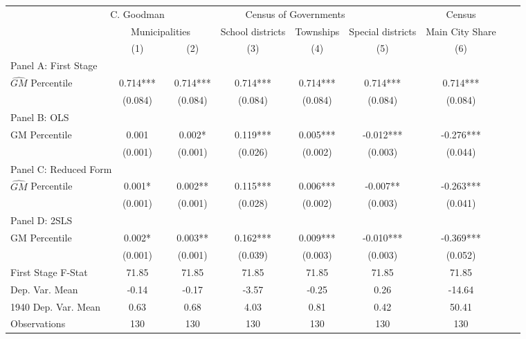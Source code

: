  \begin{tabular}{l*{8}{c}} \toprule
&\multicolumn{1}{c}{C. Goodman}&\multicolumn{4}{c}{Census of Governments}&\multicolumn{1}{c}{Census}\\\cmidrule(lr){2-2}\cmidrule(lr){3-6}\cmidrule(lr){7-7}
&\multicolumn{2}{c}{Municipalities}&\multicolumn{1}{c}{School districts}&\multicolumn{1}{c}{Townships}&\multicolumn{1}{c}{Special districts}&\multicolumn{1}{c}{Main City Share}\\\cmidrule(lr){2-3}\cmidrule(lr){4-6}\cmidrule(lr){7-7}
&\multicolumn{1}{c}{(1)}&\multicolumn{1}{c}{(2)}&\multicolumn{1}{c}{(3)}&\multicolumn{1}{c}{(4)}&\multicolumn{1}{c}{(5)}&\multicolumn{1}{c}{(6)}\\
\cmidrule(lr){1-7}
\multicolumn{6}{l}{Panel A: First Stage}\\
\cmidrule(lr){1-7}
$\widehat{GM}$ Percentile&    0.714***&    0.714***&    0.714***&    0.714***&    0.714***&    0.714***\\
                &  (0.084)   &  (0.084)   &  (0.084)   &  (0.084)   &  (0.084)   &  (0.084)   \\
\cmidrule(lr){1-7}
\multicolumn{6}{l}{Panel B: OLS}\\
\cmidrule(lr){1-7}
GM Percentile   &    0.001   &    0.002*  &    0.119***&    0.005***&   -0.012***&   -0.276***\\
                &  (0.001)   &  (0.001)   &  (0.026)   &  (0.002)   &  (0.003)   &  (0.044)   \\
\cmidrule(lr){1-7}
\multicolumn{6}{l}{Panel C: Reduced Form}\\
\cmidrule(lr){1-7}
$\widehat{GM}$ Percentile&    0.001*  &    0.002** &    0.115***&    0.006***&   -0.007** &   -0.263***\\
                &  (0.001)   &  (0.001)   &  (0.028)   &  (0.002)   &  (0.003)   &  (0.041)   \\
\cmidrule(lr){1-7}
\multicolumn{6}{l}{Panel D: 2SLS}\\
\cmidrule(lr){1-7}
GM Percentile   &    0.002*  &    0.003** &    0.162***&    0.009***&   -0.010***&   -0.369***\\
                &  (0.001)   &  (0.001)   &  (0.039)   &  (0.003)   &  (0.003)   &  (0.052)   \\
\midrule
First Stage F-Stat&    71.85   &    71.85   &    71.85   &    71.85   &    71.85   &    71.85   \\
Dep. Var. Mean  &    -0.14   &    -0.17   &    -3.57   &    -0.25   &     0.26   &   -14.64   \\
1940 Dep. Var. Mean&     0.63   &     0.68   &     4.03   &     0.81   &     0.42   &    50.41   \\
Observations    &      130   &      130   &      130   &      130   &      130   &      130   \\
       \bottomrule \end{tabular}
